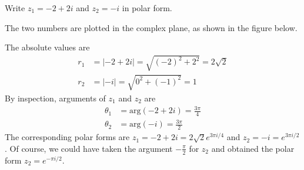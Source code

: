 \documentclass{ximera}
\begin{document}
\begin{example}\label{ex:033987}
Write $z_{1} = -2 + 2i$ and $z_{2} = -i$ in polar form.

\begin{explanation}

The two numbers are plotted in the complex plane, as shown in the figure below. 

\begin{center}
\end{center}




The absolute values are
\begin{align*}
r_1 &= |-2 + 2i| = \sqrt{(-2)^2 + 2^2} = 2\sqrt{2}\\
r_2 &= |-i| = \sqrt{0^2 + (-1)^2} = 1
\end{align*}
By inspection, arguments of $z_{1}$ and $z_{2}$ are
\begin{align*}
\theta_1 &= \mbox{arg}(-2+2i) = \frac{3\pi}{4}\\
\theta_2 &= \mbox{arg}(-i) = \frac{3\pi}{2}
\end{align*}
The corresponding polar forms are $z_{1} = -2 + 2i = 2\sqrt{2} e^{3\pi i/4}$
 and $z_{2} = -i = e^{3\pi i/2}$. Of course, we could have taken the argument $-\frac{\pi}{2}$ for $z_{2}$ and obtained the polar form $z_{2} = e^{-\pi i/2}$.
\end{explanation}
\end{example}
\end{document}
